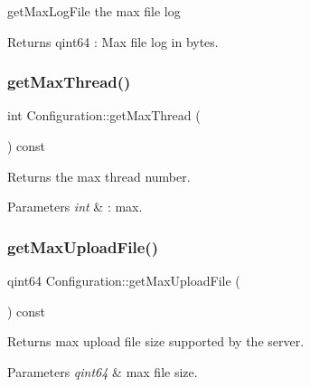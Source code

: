 get\+Max\+Log\+File the max file log 

\begin{DoxyReturn}{Returns}
qint64 \+: Max file log in bytes. 
\end{DoxyReturn}
\mbox{\label{class_configuration_ad0e836129d0a7e0111b1f2c092729939}} 
\subsubsection{\texorpdfstring{get\+Max\+Thread()}{getMaxThread()}}
{\footnotesize\ttfamily int Configuration\+::get\+Max\+Thread (\begin{DoxyParamCaption}{ }\end{DoxyParamCaption}) const\hspace{0.3cm}{\ttfamily [inline]}}



Returns the max thread number. 


\begin{DoxyParams}{Parameters}
{\em int} & \+: max. \\
\hline
\end{DoxyParams}
\mbox{\label{class_configuration_a8bc88e3cfe151837ee77e213e441953e}} 
\subsubsection{\texorpdfstring{get\+Max\+Upload\+File()}{getMaxUploadFile()}}
{\footnotesize\ttfamily qint64 Configuration\+::get\+Max\+Upload\+File (\begin{DoxyParamCaption}{ }\end{DoxyParamCaption}) const\hspace{0.3cm}{\ttfamily [inline]}}



Returns max upload file size supported by the server. 


\begin{DoxyParams}{Parameters}
{\em qint64} & max file size. \\
\hline
\end{DoxyParams}
\mbox{\label{class_configuration_a43acf80f787217903281b0a6d3e01e11}} 
